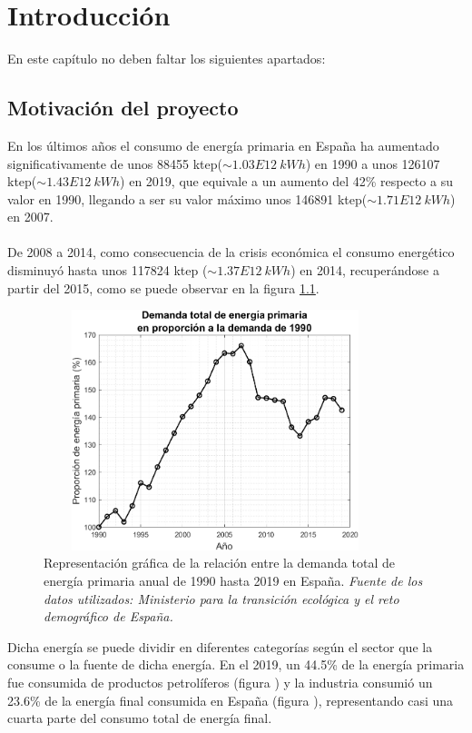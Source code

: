 \chapter{Introducción}

En este capítulo no deben faltar los siguientes apartados:

\section{Motivación del proyecto}

En los últimos años el consumo de energía primaria en España ha aumentado significativamente de unos 88455 ktep($\sim1.03E12 \ kWh$) en 1990 a unos 126107 ktep($\sim 1.43E12 \ kWh$) en 2019, que equivale a un aumento del 42\% respecto a su valor en 1990, llegando a ser su valor máximo unos 146891 ktep($\sim 1.71E12 \ kWh$) en 2007.\\\\
De 2008 a 2014, como consecuencia de la crisis económica el consumo energético disminuyó hasta unos 117824 ktep ($\sim 1.37E12 \ kWh$) en 2014, recuperándose a partir del 2015, como se puede observar en la figura \ref{fig:demandaenergiaprimariaproporcion1990}. \\
\begin{figure}[H]
	\centering
	\includegraphics[width=10cm, height=7cm]{figuras/DemandaEnergiaPrimariaProporcion1990}
	\caption{Representación gráfica de la relación entre la demanda total de energía primaria anual de 1990 hasta 2019 en España. \textit{Fuente de los datos utilizados: Ministerio para la transición ecológica y el reto demográfico de España.} }
	\label{fig:demandaenergiaprimariaproporcion1990}
\end{figure}
Dicha energía se puede dividir en diferentes categorías según el sector que la consume o la fuente de dicha energía. En el 2019, un 44.5\% de la energía primaria fue consumida de productos petrolíferos (figura ) y la industria consumió un 23.6\% de la energía final consumida en España (figura ), representando casi una cuarta parte del consumo total de energía final.
\begin{minipage}[left]{0.4\linewidth}
	
\end{minipage}
\begin{minipage}[right]{0.4\linewidth}
	
\end{minipage}


